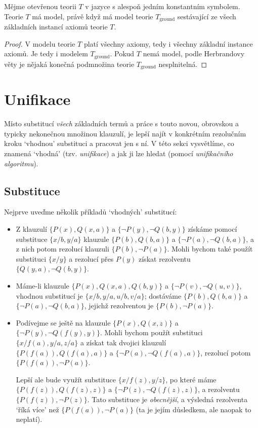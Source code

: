 \begin{corollary}\label{corollary:herbrands-theorem-corollary-ground}
    Mějme otevřenou teorii $T$ v jazyce s alespoň jedním konstantním symbolem. Teorie $T$ má model, právě když má model teorie $T_\text{ground}$ sestávající ze všech základních instancí axiomů teorie $T$.
\end{corollary}
\begin{proof}
V modelu teorie $T$ platí všechny axiomy, tedy i všechny základní instance axiomů. Je tedy i modelem $T_\text{ground}$. Pokud $T$ nemá model, podle Herbrandovy věty je nějaká konečná podmnožina teorie $T_\text{ground}$ nesplnitelná.
\end{proof}


\section{Unifikace}\label{section:unification}

Místo substitucí \emph{všech} základních termů a práce s touto novou, obrovskou a typicky nekonečnou množinou klauzulí, je lepší najít v konkrétním rezolučním kroku `vhodnou' substituci a pracovat jen s ní. V této sekci vysvětlíme, co znamená `vhodná' (tzv. \emph{unifikace}) a jak ji lze hledat (pomocí \emph{unifikačního
algoritmu}).

\subsection{Substituce}

Nejprve uveďme několik příkladů `vhodných' substitucí:

\begin{example}\label{example:substitutions}
\begin{itemize}
    \item Z klauzulí $\{P(x),Q(x,a)\}$ a $\{\neg P(y),\neg Q(b,y)\}$ získáme pomocí substituce $\{x/b,y/a\}$ klauzule $\{P(b),Q(b,a)\}$ a $\{\neg P(a),\neg Q(b,a)\}$, a z nich potom rezolucí klauzuli $\{P(b),\neg P(a)\}$. Mohli bychom také použít substituci $\{x/y\}$ a rezolucí přes $P(y)$ získat rezolventu $\{Q(y,a),\neg Q(b,y)\}$.
    \item Máme-li klauzule $\{P(x),Q(x,a),Q(b,y)\}$ a $\{\neg P(v),\neg Q(u,v)\}$, vhodnou substitucí je $\{x/b,y/a,u/b,v/a\}$; dostáváme $\{P(b),Q(b,a)\}$ a $\{\neg P(a),\neg Q(b,a)\}$, jejichž rezolventou je $\{P(b),\neg P(a)\}$.
    \item Podívejme se ještě na klauzule $\{P(x),Q(x,z)\}$ a $\{\neg P(y),\neg Q(f(y),y)\}$. Mohli bychom použít substituci $\{x/f(a),y/a,z/a\}$ a získat tak dvojici klauzulí $\{P(f(a)),Q(f(a),a)\}$ a $\{\neg P(a),\neg Q(f(a),a)\}$, rezolucí potom $\{P(f(a)),\neg P(a)\}$.

    Lepší ale bude využít substituce $\{x/f(z),y/z\}$, po které máme $\{P(f(z)),Q(f(z),z)\}$ a $\{\neg P(z),\neg Q(f(z),z)\}$, a rezolventu $\{P(f(z)),\neg P(z)\}$. Tato substituce je \emph{obecnější}, a výsledná rezolventa `říká více' než $\{P(f(a)),\neg P(a)\}$ (ta je jejím důsledkem, ale naopak to neplatí).
\end{itemize}
\end{example}

